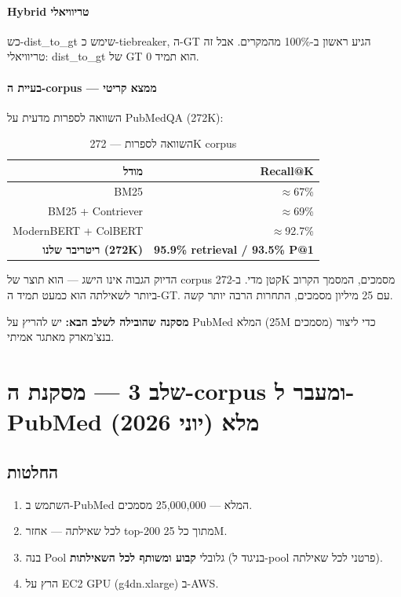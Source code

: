 \documentclass[12pt, a4paper]{article}
\begin{document}
\paragraph{Hybrid טריוויאלי}
כש-\textenglish{dist\_to\_gt} שימש כ-\textenglish{tiebreaker}, ה-\textenglish{GT} הגיע ראשון ב-100\% מהמקרים. אבל זה טריוויאלי: \textenglish{dist\_to\_gt} של \textenglish{GT} הוא תמיד 0.

\paragraph{בעיית ה-corpus --- ממצא קריטי}
השוואה לספרות מדעית על \textenglish{PubMedQA} (272K):

\begin{table}[H]
\centering
\caption{השוואה לספרות --- 272K corpus}
\begin{tabular}{rr}
\toprule
\textbf{מודל} & \textbf{\textenglish{Recall@K}} \\
\midrule
\textenglish{BM25} & $\approx$67\% \\
\textenglish{BM25 + Contriever} & $\approx$69\% \\
\textenglish{ModernBERT + ColBERT} & $\approx$92.7\% \\
\textbf{ריטריבר שלנו (272K)} & \textbf{95.9\% retrieval / 93.5\% P@1} \\
\bottomrule
\end{tabular}
\end{table}

הדיוק הגבוה אינו הישג --- הוא תוצר של \textenglish{corpus} קטן מדי. ב-272K מסמכים, המסמך הקרוב ביותר לשאילתה הוא כמעט תמיד ה-\textenglish{GT}. עם 25 מיליון מסמכים, התחרות הרבה יותר קשה.

\textbf{מסקנה שהובילה לשלב הבא:} יש להריץ על \textenglish{PubMed} המלא (25M מסמכים) כדי ליצור בנצ'מארק מאתגר אמיתי.

\section{שלב 3 --- מסקנת ה-corpus ומעבר ל-PubMed מלא (יוני 2026)}

\subsection{החלטות}
\begin{enumerate}
  \item השתמש ב-\textenglish{PubMed} המלא --- 25{,}000{,}000 מסמכים.
  \item לכל שאילתה --- אחזר \textenglish{top-200} מתוך כל 25M.
  \item בנה \textenglish{Pool} גלובלי \textbf{קבוע ומשותף לכל השאילתות} (בניגוד ל-\textenglish{pool} פרטני לכל שאילתה).
  \item הרץ על \textenglish{EC2 GPU} (\textenglish{g4dn.xlarge}) ב-\textenglish{AWS}.
\end{enumerate}
\end{document}
